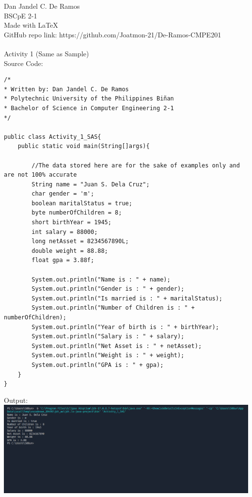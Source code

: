 \documentclass[12pt]{article}
\begin{document}
 
	\noindent
	Dan Jandel C. De Ramos\\
	BSCpE 2-1\\
	Made with \LaTeX \\
	GitHub repo link: https://github.com/Joatmon-21/De-Ramos-CMPE201\\
	\\
	Activity 1 (Same as Sample)\\
	Source Code:
	\begin{verbatim}         
/*
* Written by: Dan Jandel C. De Ramos
* Polytechnic University of the Philippines Biñan
* Bachelor of Science in Computer Engineering 2-1
*/
		
public class Activity_1_SAS{
	public static void main(String[]args){         
				
		//The data stored here are for the sake of examples only and are not 100% accurate        
		String name = "Juan S. Dela Cruz";        
		char gender = 'm';        
		boolean maritalStatus = true;
		byte numberOfChildren = 8;
		short birthYear = 1945;
		int salary = 88000;  
		long netAsset = 8234567890L;
		double weight = 88.88;
		float gpa = 3.88f;
				
		System.out.println("Name is : " + name);
		System.out.println("Gender is : " + gender);
		System.out.println("Is married is : " + maritalStatus);
		System.out.println("Number of Children is : " + numberOfChildren);
		System.out.println("Year of birth is : " + birthYear);
		System.out.println("Salary is : " + salary);
		System.out.println("Net Asset is : " + netAsset);
		System.out.println("Weight is : " + weight);
		System.out.println("GPA is : " + gpa);       
	}
}
	\end{verbatim}
	\clearpage
	\noindent
	Output:\\
	\includegraphics[width=\textwidth]{output1SAS}
\end{document}
